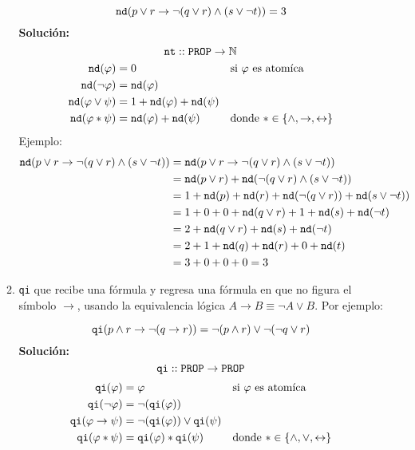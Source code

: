 \documentclass[8pt, letterpaper]{article}
\begin{document}
\begin{enumerate}
\begin{enumerate}
    $${\tt nd} (p \lor r \to \lnot (q \lor r) \land (s\lor\neg t)) = 3$$
    \ttfamily
    {\bf Solución:}
    \hfill\break
    $${\tt nt} :: {\tt PROP} \rightarrow \mathbb{N}$$
    \begin{align*}
      {\tt nd}(\varphi) &= 0 & &\text{si $\varphi$ es atomíca}\\
      {\tt nd}(\neg\varphi) &= {\tt nd}(\varphi) \\
      {\tt nd}(\varphi \lor \psi) &= 1 + {\tt nd}(\varphi) +
      {\tt nd}(\psi) \\
      {\tt nd}(\varphi * \psi) &= {\tt nd}(\varphi) + {\tt nd}(\psi) &
      &\text{donde $*$} \in\{\land, \rightarrow, \leftrightarrow\}\\
    \end{align*}
    \newpage
    Ejemplo:
    \begin{align*}
      {\tt nd} (p \lor r \to \lnot (q \lor r) \land (s\lor\neg t)) &= {\tt nd} (p \lor r \to \lnot (q \lor r) \land (s\lor\neg t)) \\
      &= {\tt nd}(p \lor r) + {\tt nd}(\lnot (q \lor r) \land (s\lor\neg t)) \\
      &= 1 + {\tt nd}(p) + {\tt nd}( r) + {\tt nd}(\lnot (q \lor r)) +
      {\tt nd}(s\lor\neg t)) \\
      &= 1 + 0 + 0 + {\tt nd}(q \lor r) + 1 +{\tt nd}(s) + {\tt nd}(\neg t) \\
      &= 2 + {\tt nd}(q \lor r) + {\tt nd}(s) + {\tt nd}(\neg t) \\
      &= 2 + 1 + {\tt nd}(q) + {\tt nd}(r) + 0 + {\tt nd}(t) \\
      &= 3 + 0 +0 +0 = 3
    \end{align*}

    \rmfamily

  \item {\tt qi} que recibe una fórmula y regresa una fórmula en que no figura
    el símbolo $\to$, usando la equivalencia lógica
    $A\to B\equiv \neg A\lor B$. Por ejemplo:

    $${\tt qi} (p \land r \to \lnot (q \to r)) = \lnot (p \land r) \lor \lnot(\lnot q \lor r)$$
        \ttfamily
    {\bf Solución:}
    \hfill\break
    $${\tt qi} :: {\tt PROP} \rightarrow {\tt PROP}$$
    \begin{align*}
      {\tt qi}(\varphi) &= \varphi & &\text{si $\varphi$ es atomíca}\\
      {\tt qi}(\neg\varphi) &= \neg({\tt qi}(\varphi))\\
      {\tt qi}(\varphi \rightarrow \psi) &= \neg({\tt qi}(\varphi))\lor {\tt qi}(\psi) \\
      {\tt qi}(\varphi * \psi) &= {\tt qi}(\varphi) * {\tt qi}(\psi) &
      &\text{donde $*$} \in\{\land, \lor, \leftrightarrow\}
    \end{align*}


\end{enumerate}
\end{enumerate}
\end{document}
